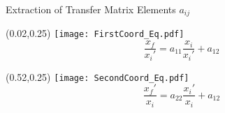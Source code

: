\documentclass[10pt,aspectratio=169]{beamer}
\begin{document}
\begin{frame}{Extraction of Transfer Matrix Elements $a_{ij}$}
    \begin{textblock*}{0.5\paperwidth}(0.02\paperwidth,0.25\paperheight)
			\centering
			\texttt{[image: FirstCoord\_Eq.pdf]}
            \begin{equation*}
                \frac{x_f}{x_i'} = a_{11}\frac{x_i}{x_i'} + a_{12}
            \end{equation*}
		\end{textblock*}
    \begin{textblock*}{0.5\paperwidth}(0.52\paperwidth,0.25\paperheight)
			\centering
			\texttt{[image: SecondCoord\_Eq.pdf]}
            \begin{equation*}
                \frac{x_f'}{x_i} = a_{22}\frac{x_i'}{x_i} + a_{12}
            \end{equation*}
		\end{textblock*}
  
\end{frame}
\end{document}
